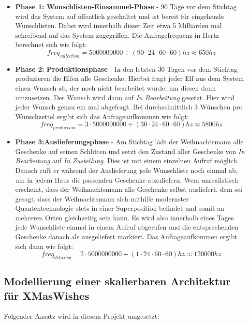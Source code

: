\documentclass[12pt]{article}
\begin{document}
\begin{itemize}
	\item \textbf{Phase 1: Wunschlisten-Einsammel-Phase} - 90 Tage vor dem Stichtag wird das System auf öffentlich geschaltet und ist bereit für eingehende Wunschlisten. Dabei wird innerhalb dieser Zeit etwa 5 Milliarden mal schreibend auf das System zugegriffen. Die Anfragefrequenz in Hertz berechnet sich wie folgt: 
	$$freq_{collection} = 5000000000 \div (90 \cdot 24 \cdot 60 \cdot 60) hz \approx 650 hz $$
	
	\item \textbf{Phase 2: Produktionsphase} - In den letzten 30 Tagen vor dem Stichtag produzieren die Elfen alle Geschenke. Hierbei fragt jeder Elf aus dem System einen Wunsch ab, der noch nicht bearbeitet wurde, um diesen dann umzusetzen. Der Wunsch wird dann auf \emph{In Bearbeitung} gesetzt. Hier wird jeder Wunsch genau ein mal abgefragt. Bei durchschnittlich 3 Wünschen pro Wunschzettel ergibt sich das Anfrageaufkommen wie folgt:
	$$freq_{production} = 3 \cdot 5000000000 \div (30 \cdot 24 \cdot 60 \cdot 60) hz \approx 5800 hz$$
	
	\item \textbf{Phase 3:Auslieferungsphase} - Am Stichtag lädt der Weihnachtsmann alle Geschenke auf seinen Schlitten und setzt den Zustand aller Geschenke von \emph{In Bearbeitung} auf \emph{In Zustellung}. Dies ist mit einem einzelnen Aufruf möglich.
	Danach ruft er während der Auslieferung jede Wunschliste noch einmal ab, um in jedem Haus die passenden Geschenke abzuliefern.
	Wem unrealistisch erscheint, dass der Weihnachtsmann alle Geschenke selbst ausliefert, dem sei gesagt, dass der Weihnachtsmann sich mithilfe modernster Quantentechnologie stets in einer Superposition befindet und somit an mehreren Orten gleichzeitig sein kann.
	Es wird also innerhalb eines Tages jede Wunschliste einmal in einem Aufruf abgerufen und die entsprechenden Geschenke danach als ausgeliefert markiert.
	Das Anfrageaufkommen ergibt sich dann wie folgt:
	$$freq_{delivery} = 2 \cdot 5000000000 \div (1 \cdot 24 \cdot 60 \cdot 60) hz \approx120000 hz$$
	
\end{itemize}

\subsection*{Modellierung einer skalierbaren Architektur für XMasWishes}
Folgender Ansatz wird in diesem Projekt umgesetzt:
\end{document}
